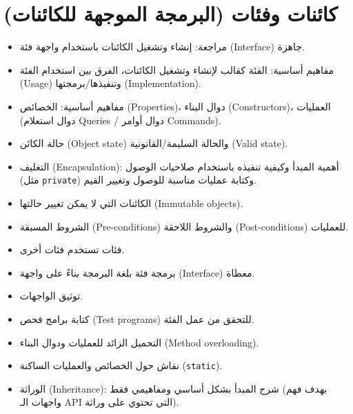 ﻿\documentclass[14pt]{extarticle}
\begin{document}
\clearpage
\section{كائنات وفئات (البرمجة الموجهة للكائنات)}

\begin{itemize}
    \item مراجعة: إنشاء وتشغيل الكائنات باستخدام واجهة فئة (\textenglish{Interface}) جاهزة.
    \item مفاهيم أساسية: الفئة كقالب لإنشاء وتشغيل الكائنات، الفرق بين استخدام الفئة (\textenglish{Usage}) وتنفيذها/برمجتها (\textenglish{Implementation}).
    \item مفاهيم أساسية: الخصائص (\textenglish{Properties})، دوال البناء (\textenglish{Constructors})، العمليات (دوال استعلام \textenglish{Queries} / دوال أوامر \textenglish{Commands}).
    \item حالة الكائن (\textenglish{Object state}) والحالة السليمة/القانونية (\textenglish{Valid state}).
    \item التغليف (\textenglish{Encapsulation}): أهمية المبدأ وكيفية تنفيذه باستخدام صلاحيات الوصول (مثل \texttt{private}) وكتابة عمليات مناسبة للوصول وتغيير القيم.
    \item الكائنات التي لا يمكن تغيير حالتها (\textenglish{Immutable objects}).
    \item الشروط المسبقة (\textenglish{Pre-conditions}) والشروط اللاحقة (\textenglish{Post-conditions}) للعمليات.
    \item فئات تستخدم فئات أخرى.
    \item برمجة فئة بلغة البرمجة بناءً على واجهة (\textenglish{Interface}) معطاة.
    \item توثيق الواجهات.
    \item كتابة برامج فحص (\textenglish{Test programs}) للتحقق من عمل الفئة.
    \item التحميل الزائد للعمليات ودوال البناء (\textenglish{Method overloading}).
    \item نقاش حول الخصائص والعمليات الساكنة (\texttt{static}).
    \item الوراثة (\textenglish{Inheritance}): شرح المبدأ بشكل أساسي ومفاهيمي فقط (بهدف فهم واجهات الـ \textenglish{API} التي تحتوي على وراثة).
\end{itemize}
\end{document}
